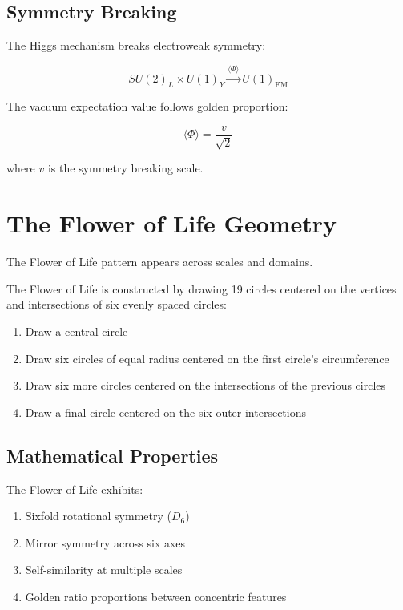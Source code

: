 \subsection{Symmetry Breaking}

The Higgs mechanism breaks electroweak symmetry:

\begin{equation}
SU(2)_L \times U(1)_Y \xrightarrow{\langle\Phi\rangle} U(1)_{\text{EM}}
\end{equation}

The vacuum expectation value follows golden proportion:

\begin{equation}
\langle\Phi\rangle = \frac{v}{\sqrt{2}}
\end{equation}

where $v$ is the symmetry breaking scale.

\section{The Flower of Life Geometry}

The Flower of Life pattern appears across scales and domains.

\begin{definition}
\label{def:flower-of-life}
The Flower of Life is constructed by drawing 19 circles centered on the vertices and intersections of six evenly spaced circles:
\begin{enumerate}
    \item Draw a central circle
    \item Draw six circles of equal radius centered on the first circle's circumference
    \item Draw six more circles centered on the intersections of the previous circles
    \item Draw a final circle centered on the six outer intersections
\end{enumerate}
\end{definition}

\subsection{Mathematical Properties}

\begin{theorem}
\label{thm:flower-symmetry}
The Flower of Life exhibits:
\begin{enumerate}
    \item Sixfold rotational symmetry ($D_6$)
    \item Mirror symmetry across six axes
    \item Self-similarity at multiple scales
    \item Golden ratio proportions between concentric features
\end{enumerate}
\end{theorem}

